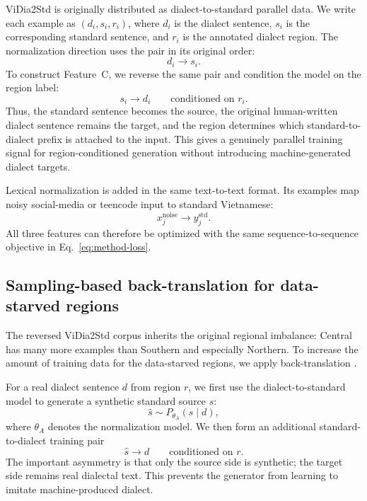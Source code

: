 \documentclass[11pt]{article}
\begin{document}
ViDia2Std is originally distributed as dialect-to-standard parallel data. We
write each example as \((d_i,s_i,r_i)\), where \(d_i\) is the dialect sentence,
\(s_i\) is the corresponding standard sentence, and \(r_i\) is the annotated
dialect region. The normalization direction uses the pair in its original order:
\begin{equation}
  d_i \longrightarrow s_i.
  \label{eq:forward-pair}
\end{equation}
To construct Feature~C, we reverse the same pair and condition the model on the
region label:
\begin{equation}
  s_i \longrightarrow d_i
  \qquad \text{conditioned on } r_i.
  \label{eq:reverse-pair}
\end{equation}
Thus, the standard sentence becomes the source, the original human-written
dialect sentence remains the target, and the region determines which
standard-to-dialect prefix is attached to the input. This gives a genuinely
parallel training signal for region-conditioned generation without introducing
machine-generated dialect targets.

Lexical normalization is added in the same text-to-text format. Its examples
map noisy social-media or teencode input to standard Vietnamese:
\begin{equation}
  x_j^{\mathrm{noise}} \longrightarrow y_j^{\mathrm{std}}.
  \label{eq:lexnorm-pair}
\end{equation}
All three features can therefore be optimized with the same sequence-to-sequence
objective in Eq.~\ref{eq:method-loss}.

\subsection{Sampling-based back-translation for data-starved regions}
\label{sec:method-bt}

The reversed ViDia2Std corpus inherits the original regional imbalance: Central
has many more examples than Southern and especially Northern. To increase the
amount of training data for the data-starved regions, we apply
back-translation \citep{sennrich2016improving,edunov2018understanding}.

For a real dialect sentence \(d\) from region \(r\), we first use the
dialect-to-standard model to generate a synthetic standard source \(\hat{s}\):
\begin{equation}
  \hat{s}
  \sim
  P_{\theta_A}(s \mid d),
  \label{eq:bt-sample}
\end{equation}
where \(\theta_A\) denotes the normalization model. We then form an additional
standard-to-dialect training pair
\begin{equation}
  \hat{s} \longrightarrow d
  \qquad \text{conditioned on } r.
  \label{eq:bt-pair}
\end{equation}
The important asymmetry is that only the source side is synthetic; the target
side remains real dialectal text. This prevents the generator from learning to
imitate machine-produced dialect.
\end{document}
